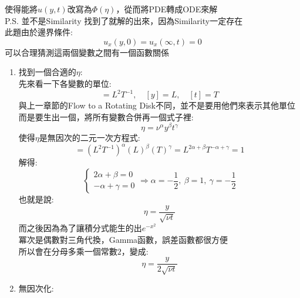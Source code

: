 \documentclass[../main.tex]{subfiles}
\begin{document}
\begin{itemize}
\begin{enumerate}
\begin{itemize}
      使得能將$u(y,t)$改寫為$\Phi(\eta)$，從而將PDE轉成ODE來解\\
      P.S. 並不是Similarity 找到了就解的出來，因為Similarity一定存在\\
      此題由於邊界條件:
      \begin{equation}
        u_x(y,0) = u_x(\infty, t) = 0
      \end{equation}
      可以合理猜測這兩個變數之間有一個函數關係
      \begin{enumerate}
        \item 找到一個合適的$\eta$:\\
          先來看一下各變數的單位:
          \begin{equation}
            [\nu] = L^2T^{-1},\quad [y] = L,\quad [t] = T
          \end{equation}
          與上一章節的Flow to a Rotating Disk不同，並不是要用他們來表示其他單位\\
          而是要生出一個，將所有變數合併再一個式子裡:
          \begin{equation}
            \eta = \nu^\alpha y^\beta t^\gamma
          \end{equation}
          使得$\eta$是無因次的二元一次方程式:
          \begin{equation}
            [\eta] = (L^2T^{-1})^\alpha (L)^\beta (T)^\gamma = L^{2\alpha + \beta} T^{-\alpha + \gamma} = 1
          \end{equation}
          解得:
          \begin{equation}
            \begin{cases}
              2\alpha + \beta = 0\\
              -\alpha + \gamma = 0
            \end{cases} \Rightarrow \alpha = -\frac{1}{2},~\beta = 1,~\gamma = -\frac{1}{2}
          \end{equation}
          也就是說:
          \begin{equation}
            \eta = \frac{y}{\sqrt{\nu t}}
          \end{equation}
          而之後因為為了讓積分式能生的出$e^{-x^2}$\\
          冪次是偶數對三角代換，Gamma函數，誤差函數都很方便\\
          所以會在分母多乘一個常數$2$，變成:
          \begin{equation}
            \eta = \frac{y}{2\sqrt{\nu t}} 
          \end{equation}
        \item 無因次化:\\

\end{enumerate}
\end{itemize}
\end{enumerate}
\end{itemize}
\end{document}
